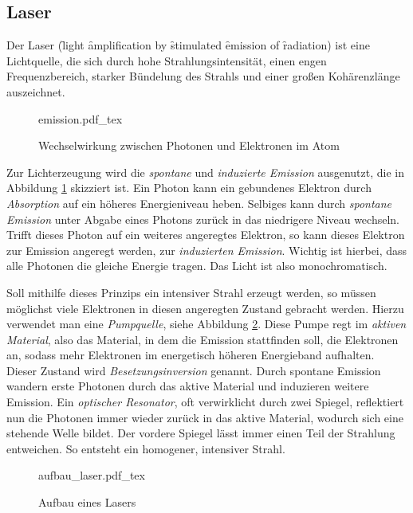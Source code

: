     \subsection{Laser}

Der Laser (\f light \f amplification by \f stimulated \f emission of \f radiation)
ist eine Lichtquelle, die sich durch hohe Strahlungsintensität, einen engen 
Frequenzbereich, starker Bündelung des Strahls und einer großen Kohärenzlänge 
auszeichnet.
\begin{figure}[h]
  \centering
  {emission.pdf_tex}
  \caption{Wechselwirkung zwischen Photonen und Elektronen im Atom}
  \label{abb:emission}
\end{figure}
Zur Lichterzeugung wird die \emph{spontane} und \emph{induzierte Emission} 
ausgenutzt, die in Abbildung \ref{abb:emission} skizziert ist. Ein Photon kann
ein gebundenes Elektron durch \emph{Absorption} auf ein höheres Energieniveau 
heben. Selbiges kann durch \emph{spontane Emission} unter Abgabe eines Photons
zurück in das niedrigere Niveau wechseln. Trifft dieses Photon auf ein weiteres
angeregtes Elektron, so kann dieses Elektron zur Emission angeregt werden, zur
\emph{induzierten Emission}. Wichtig ist hierbei, dass alle Photonen die gleiche
Energie tragen. Das Licht ist also monochromatisch. \par
Soll mithilfe dieses Prinzips ein intensiver Strahl erzeugt werden, so müssen 
möglichst viele Elektronen in diesen angeregten Zustand gebracht werden. Hierzu
verwendet man eine \emph{Pumpquelle}, siehe Abbildung \ref{abb:aufbau_laser}.
Diese Pumpe regt im \emph{aktiven Material},
also das Material, in dem die Emission stattfinden soll, die Elektronen an, sodass
mehr Elektronen im energetisch höheren Energieband aufhalten. Dieser Zustand wird
\emph{Besetzungsinversion} genannt. Durch spontane Emission wandern erste Photonen
durch das aktive Material und induzieren weitere Emission. 
Ein \emph{optischer Resonator}, oft verwirklicht durch zwei Spiegel, reflektiert nun
die Photonen immer wieder zurück in das aktive Material, wodurch sich eine stehende
Welle bildet. Der vordere Spiegel lässt immer einen Teil der Strahlung entweichen.
So entsteht ein homogener, intensiver Strahl. 
\begin{figure}[h]
  \centering
  {aufbau_laser.pdf_tex}
  \caption{Aufbau eines Lasers}
  \label{abb:aufbau_laser}
\end{figure}

